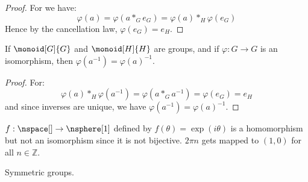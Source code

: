 \documentclass{article}                                                        %
\begin{document}
            \begin{proof}
                For we have:
                \begin{equation}
                    \varphi(a)=\varphi(a*_{G}e_{G})
                              =\varphi(a)*_{H}\varphi(e_{G})
                \end{equation}
                Hence by the cancellation law, $\varphi(e_{G})=e_{H}$.
            \end{proof}
            \begin{theorem}
                If $\monoid[G]{G}$ and $\monoid[H]{H}$ are groups, and if
                $\varphi:G\rightarrow{G}$ is an isomorphism, then
                $\varphi(a^{\minus{1}})=\varphi(a)^{\minus{1}}$.
            \end{theorem}
            \begin{proof}
                For:
                \begin{equation}
                    \varphi(a)*_{H}\varphi(a^{\minus{1}})
                        =\varphi(a*_{G}a^{\minus{1}})
                        =\varphi(e_{G})
                        =e_{H}
                \end{equation}
                and since inverses are unique, we have
                $\varphi(a^{\minus{1}})=\varphi(a)^{\minus{1}}$.
            \end{proof}
            \begin{example}
                $f:\nspace[]\rightarrow\nsphere[1]$ defined by
                $f(\theta)=\exp(i\theta)$ is a homomorphism but not an
                isomorphism since it is not bijective. $2\pi{n}$ gets mapped to
                $(1,0)$ for all $n\in\mathbb{Z}$.
            \end{example}
            Symmetric groups.
\end{document}
